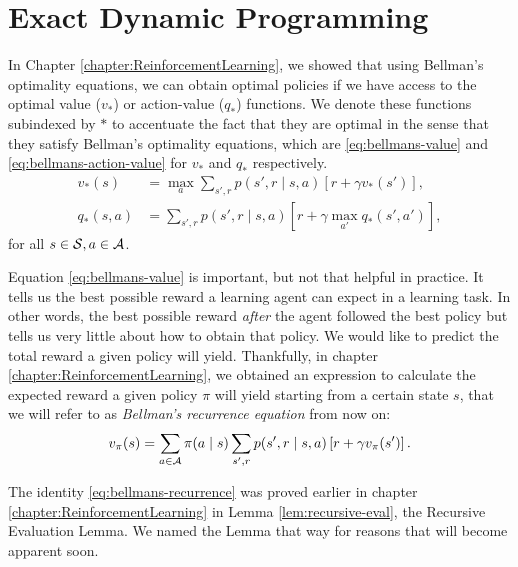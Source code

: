 \section{Exact Dynamic Programming}

In Chapter \ref{chapter:ReinforcementLearning}, we showed that using Bellman's
optimality equations, we can obtain optimal policies if we have access to the
optimal value ($v_*$) or action-value ($q_{*}$) functions. We denote these
functions subindexed by $*$ to accentuate the fact that they are optimal in the
sense that they satisfy Bellman's optimality equations, which are
\eqref{eq:bellmans-value} and \eqref{eq:bellmans-action-value} for $v_*$ and
$q_*$ respectively. 
\begin{align}
v_{*}(s) &= \max_{a} \sum_{s', r} p(s', r \mid s, a) \left[ r + \gamma v_{*} (s')
\right], \label{eq:bellmans-value} \\
q_{*}(s, a) &= \sum_{s', r} p(s', r \mid s, a) \left[ r + \gamma \max_{a'} q_{*}
(s', a') \right], \label{eq:bellmans-action-value}
\end{align}
for all $s \in \mathcal{S}, a \in \mathcal{A}$.

Equation \eqref{eq:bellmans-value} is important, but not that helpful in
practice. It tells us the best possible reward a learning agent can expect in a
learning task. In other words, the best possible reward \textit{after} the agent
followed the best policy but tells us very little about how to obtain that
policy. We would like to predict the total reward a given policy will yield.
Thankfully, in chapter \ref{chapter:ReinforcementLearning}, we obtained an
expression to calculate the expected reward a given policy $\pi$ will yield
starting from a certain state $s$, that we will refer to as \textit{Bellman's
recurrence equation} from now on: 
\begin{equation}
\label{eq:bellmans-recurrence}
v_\pi (s) = \sum_{a \in \mathcal{A}} \pi(a \mid s) \sum_{s', r} p(s', r \mid s, a) \left[ r + \gamma v_{\pi}(s') \right].
\end{equation}

The identity \eqref{eq:bellmans-recurrence} was proved earlier in chapter
\ref{chapter:ReinforcementLearning} in Lemma \ref{lem:recursive-eval}, the
Recursive Evaluation Lemma. We named the Lemma that way for reasons that will
become apparent soon.

